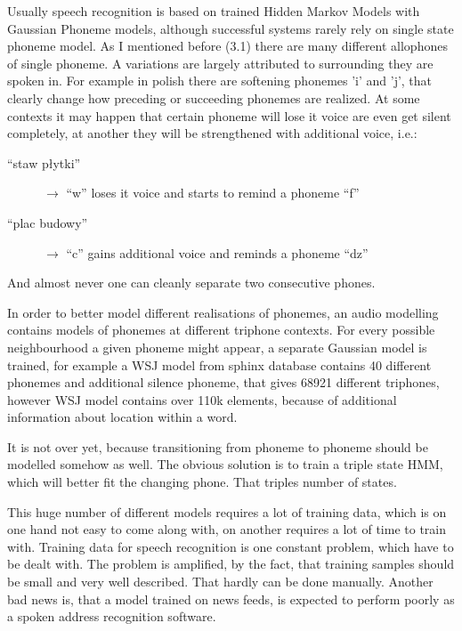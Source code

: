 \documentclass[12pt,a4paper,english]{article}
\begin{document}
Usually speech recognition is based on trained Hidden Markov Models with Gaussian Phoneme models, although successful systems rarely rely on single state phoneme model. \newline
As I mentioned before (3.1) there are many different allophones of single phoneme. A variations are largely attributed to surrounding they are spoken in. For example in polish there are softening phonemes 'i' and 'j', that clearly change how preceding or succeeding phonemes are realized. At some contexts it may happen that certain phoneme will lose it voice are even get silent completely, at another they will be strengthened with additional voice, i.e.: 
\begin{description}
	\item[“staw płytki”] $\rightarrow$ “w” loses it voice and starts to remind a phoneme “f”
	\item[“plac budowy”] $\rightarrow$ “c” gains additional voice and reminds a phoneme “dz”
\end{description}
And almost never one can cleanly separate two consecutive phones. \newline

 In order to better model different realisations of phonemes, an audio modelling contains models of phonemes at different triphone contexts. 
For every possible neighbourhood a given phoneme might appear, a separate Gaussian model is trained, for example a WSJ model from sphinx database contains 40 different phonemes and additional silence phoneme, that gives 68921 different triphones, however WSJ model contains over 110k elements,  because of additional information about location within a word. \newline

It is not over yet, because transitioning from phoneme to phoneme should be modelled somehow as well. The obvious solution is to train a triple state HMM, which will better fit the changing phone. \newline
That triples number of states. \newline

This huge number of different models requires a lot of training data, which is on one hand not easy to come along with, on another requires a lot of time to train with. \newline
Training data for speech recognition is one constant problem, which have to be dealt with. The problem is amplified, by the fact, that training samples should be small and very well described. That hardly can be done manually. \newline
Another bad news is, that a model trained on news feeds, is expected to perform poorly as a spoken address recognition software. \newline
\end{document}
